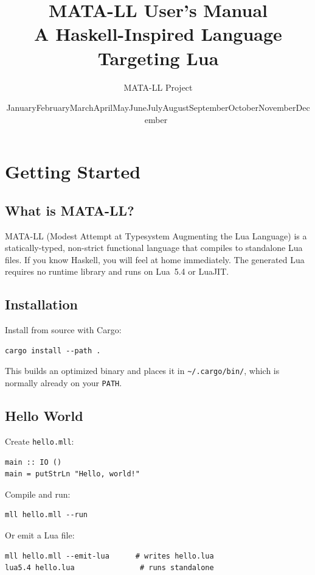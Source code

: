\documentclass[11pt,a4paper]{article}
\title{\textbf{MATA-LL User's Manual}\\[6pt]
  \large A Haskell-Inspired Language Targeting Lua}
\author{MATA-LL Project}
\date{\ifcase\month\or January\or February\or March\or April\or May\or June\or July\or August\or September\or October\or November\or December\fi\ \the\year}
\begin{document}
\maketitle
\tableofcontents
\clearpage

\section{Getting Started}

\subsection{What is MATA-LL?}

MATA-LL (Modest Attempt at Typesystem Augmenting the Lua Language) is a
statically-typed, non-strict functional language that compiles to standalone
Lua files.  If you know Haskell, you will feel at home immediately.  The
generated Lua requires no runtime library and runs on Lua~5.4 or LuaJIT.

\subsection{Installation}

Install from source with Cargo:

\begin{lstlisting}[language={}]
cargo install --path .
\end{lstlisting}

This builds an optimized binary and places it in \texttt{\textasciitilde/.cargo/bin/},
which is normally already on your \texttt{PATH}.

\subsection{Hello World}

Create \texttt{hello.mll}:

\begin{lstlisting}
main :: IO ()
main = putStrLn "Hello, world!"
\end{lstlisting}

Compile and run:

\begin{lstlisting}[language={}]
mll hello.mll --run
\end{lstlisting}

Or emit a Lua file:

\begin{lstlisting}[language={}]
mll hello.mll --emit-lua      # writes hello.lua
lua5.4 hello.lua               # runs standalone
\end{lstlisting}
\end{document}
